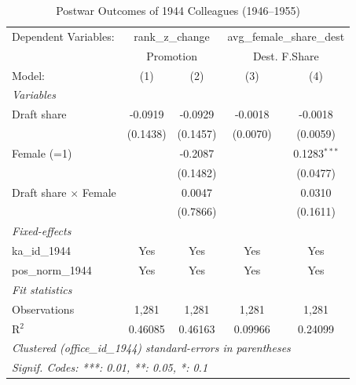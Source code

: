 \begin{table}[htbp]
\centering
\caption{Postwar Outcomes of 1944 Colleagues (1946--1955)}
\label{tab:future}
\small
\begin{threeparttable}
\begingroup
\centering
\begin{tabular}{lcccc}
   \tabularnewline \midrule \midrule
   Dependent Variables: & \multicolumn{2}{c}{rank\_z\_change} & \multicolumn{2}{c}{avg\_female\_share\_dest}\\
    & \multicolumn{2}{c}{Promotion} & \multicolumn{2}{c}{Dest. F.Share} \\ 
   Model:                       & (1)      & (2)      & (3)      & (4)\\  
   \midrule
   \emph{Variables}\\
   Draft share                  & -0.0919  & -0.0929  & -0.0018  & -0.0018\\   
                                & (0.1438) & (0.1457) & (0.0070) & (0.0059)\\   
   Female (=1)                  &          & -0.2087  &          & 0.1283$^{***}$\\   
                                &          & (0.1482) &          & (0.0477)\\   
   Draft share $\times$ Female  &          & 0.0047   &          & 0.0310\\   
                                &          & (0.7866) &          & (0.1611)\\   
   \midrule
   \emph{Fixed-effects}\\
   ka\_id\_1944                 & Yes      & Yes      & Yes      & Yes\\  
   pos\_norm\_1944              & Yes      & Yes      & Yes      & Yes\\  
   \midrule
   \emph{Fit statistics}\\
   Observations                 & 1,281    & 1,281    & 1,281    & 1,281\\  
   R$^2$                        & 0.46085  & 0.46163  & 0.09966  & 0.24099\\  
   \midrule \midrule
   \multicolumn{5}{l}{\emph{Clustered (office\_id\_1944) standard-errors in parentheses}}\\
   \multicolumn{5}{l}{\emph{Signif. Codes: ***: 0.01, **: 0.05, *: 0.1}}\\
\end{tabular}
\par\endgroup
\begin{tablenotes}[flushleft]
\footnotesize

\end{tablenotes}
\end{threeparttable}
\end{table}
